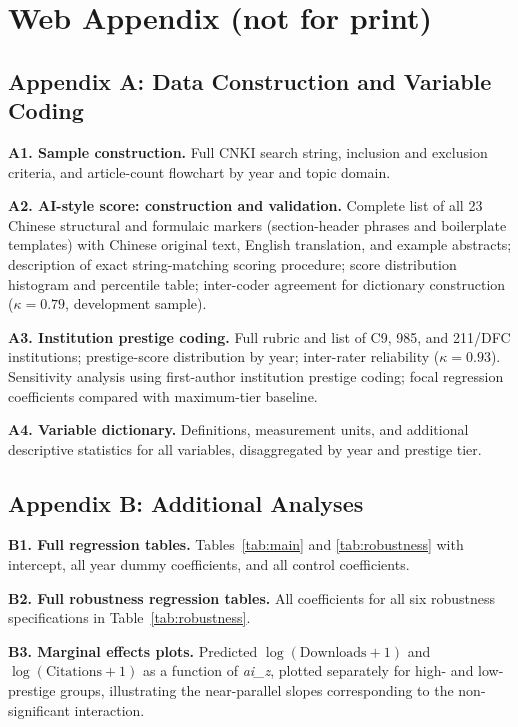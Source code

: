 \documentclass[12pt,a4paper]{article}
\begin{document}
\newpage
\section*{Web Appendix (not for print)}

\subsection*{Appendix A: Data Construction and Variable Coding}

\textbf{A1. Sample construction.}
Full CNKI search string, inclusion and exclusion criteria, and
article-count flowchart by year and topic domain.

\textbf{A2. AI-style score: construction and validation.}
Complete list of all 23 Chinese structural and formulaic markers
(section-header phrases and boilerplate templates) with Chinese
original text, English translation, and example abstracts;
description of exact string-matching scoring procedure;
score distribution histogram and percentile table;
inter-coder agreement for dictionary construction ($\kappa=0.79$,
development sample).

\textbf{A3. Institution prestige coding.}
Full rubric and list of C9, 985, and 211/DFC institutions;
prestige-score distribution by year; inter-rater reliability ($\kappa=0.93$).
Sensitivity analysis using first-author institution prestige coding;
focal regression coefficients compared with maximum-tier baseline.

\textbf{A4. Variable dictionary.}
Definitions, measurement units, and additional descriptive statistics
for all variables, disaggregated by year and prestige tier.

\subsection*{Appendix B: Additional Analyses}

\textbf{B1. Full regression tables.}
Tables~\ref{tab:main} and \ref{tab:robustness} with intercept,
all year dummy coefficients, and all control coefficients.

\textbf{B2. Full robustness regression tables.}
All coefficients for all six robustness specifications in
Table~\ref{tab:robustness}.

\textbf{B3. Marginal effects plots.}
Predicted $\log(\text{Downloads}+1)$ and $\log(\text{Citations}+1)$
as a function of \textit{ai\_z}, plotted separately for high- and
low-prestige groups, illustrating the near-parallel slopes corresponding
to the non-significant interaction.
\end{document}
